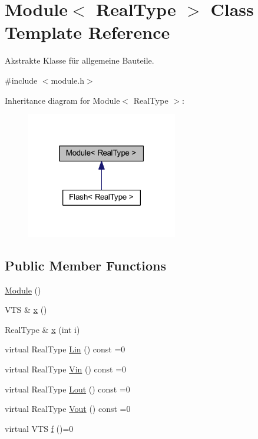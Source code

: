 \hypertarget{class_module}{}\section{Module$<$ Real\+Type $>$ Class Template Reference}
\label{class_module}


Akstrakte Klasse für allgemeine Bauteile.  




{\ttfamily \#include $<$module.\+h$>$}



Inheritance diagram for Module$<$ Real\+Type $>$\+:\nopagebreak
\begin{figure}[H]
\begin{center}
\leavevmode
\includegraphics[width=187pt]{class_module__inherit__graph}
\end{center}
\end{figure}
\subsection*{Public Member Functions}
\begin{DoxyCompactItemize}
\item 
\mbox{\hyperlink{class_module_a1ca1033f86253716d23f1fc6e4152ce8}{Module}} ()
\item 
V\+TS \& \mbox{\hyperlink{class_module_acf76d87028eea43147dce5812a0ed508}{x}} ()
\item 
Real\+Type \& \mbox{\hyperlink{class_module_adb7d9d50d85d8a2bdae6351ed7d57de8}{x}} (int i)
\item 
virtual Real\+Type \mbox{\hyperlink{class_module_afd5ad051a1d37aac40709badad675732}{Lin}} () const =0
\item 
virtual Real\+Type \mbox{\hyperlink{class_module_a5ef6a7e21c2941a3e8940e7c0e5f0670}{Vin}} () const =0
\item 
virtual Real\+Type \mbox{\hyperlink{class_module_a0258058bfb378f0016b3306dcb8082f3}{Lout}} () const =0
\item 
virtual Real\+Type \mbox{\hyperlink{class_module_ae479ac97ae43fd740cdd44b947b952d9}{Vout}} () const =0
\item 
virtual V\+TS \mbox{\hyperlink{class_module_ad28dc7d3309858af1011b60b53c51c1a}{f}} ()=0
\end{DoxyCompactItemize}
